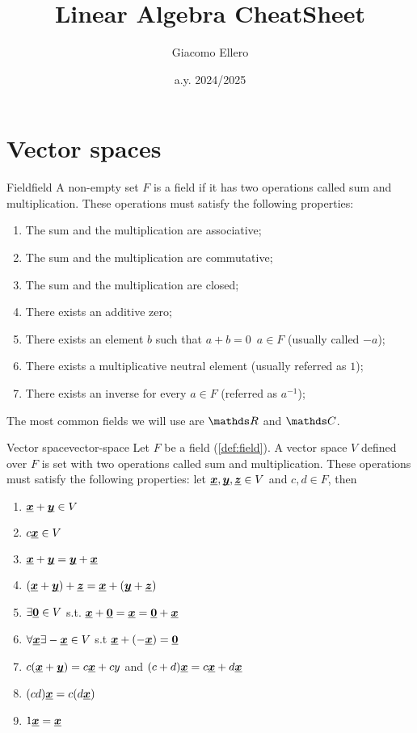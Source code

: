 \documentclass[12pt]{extarticle}
\title{Linear Algebra CheatSheet}
\author{Giacomo Ellero}
\date{a.y. 2024/2025}
\renewcommand{\vec}[1]{\uvec{#1}}
\begin{document}
\firstpage

\section{Vector spaces}

\begin{definition}{Field}{field}
	A non-empty set $F$ is a field if it has two operations called sum and multiplication.
	These operations must satisfy the following properties:
	\begin{enumerate}
		\item The sum and the multiplication are associative;
		\item The sum and the multiplication are commutative;
		\item The sum and the multiplication are closed;
		\item There exists an additive zero;
		\item There exists an element $b$ such that $a+b = 0 \enspace a \in F$ (usually called $-a$);
		\item There exists a multiplicative neutral element (usually referred as $1$);
		\item There exists an inverse for every $a \in F$ (referred as $a^{-1}$);
	\end{enumerate}
\end{definition}

The most common fields we will use are $\R$ and $\C$.

\begin{definition}{Vector space}{vector-space}
	Let $F$ be a field (\cref{def:field}). A vector space $V$ defined over $F$ is set with two operations called sum and multiplication.
	These operations must satisfy the following properties: let $\vec{x} , \vec{y}, \vec{z} \in V$ and $c, d \in F$, then
	\begin{enumerate}
		\item $ \vec{x} +\vec{y} \in V$
		\item $c \vec{x}  \in V$
		\item $ \vec{x}  + \vec{y} = \vec{y}+  \vec{x} $
		\item $ (\vec x + \vec y) + \vec z = \vec x + (\vec y + \vec z)$
		\item $\exists \vec 0 \in V$ s.t. $ \vec{x} +\vec 0 =  \vec{x}  = \vec 0 +  \vec{x} $
		\item $\forall \vec x \exists -\vec x \in V$ s.t $\vec x + (-\vec x) = \vec 0 $
		\item $c( \vec{x} +\vec{y}) = c \vec{x}  + cy$ and $(c+d) \vec{x}  = c \vec{x}  + d \vec{x} $
		\item $(cd) \vec{x}  = c(d \vec{x} )$
		\item $1\vec x = \vec x$
	\end{enumerate}
\end{definition}
\end{document}
